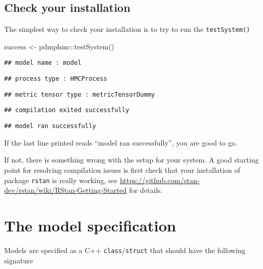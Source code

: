 \documentclass[
]{book}
\newenvironment{Shaded}{\begin{snugshade}}{\end{snugshade}}
\newcommand{\FunctionTok}[1]{\textcolor[rgb]{0.00,0.00,0.00}{#1}}
\newcommand{\NormalTok}[1]{#1}
\newcommand{\OtherTok}[1]{\textcolor[rgb]{0.56,0.35,0.01}{#1}}
\newcommand{\SpecialCharTok}[1]{\textcolor[rgb]{0.00,0.00,0.00}{#1}}
\begin{document}
\hypertarget{check-your-installation}{%
\section{Check your installation}\label{check-your-installation}}

The simplest way to check your installation is to try to run the \texttt{testSystem()}

\begin{Shaded}
\begin{Highlighting}[]
\NormalTok{success }\OtherTok{\textless{}{-}}\NormalTok{ pdmphmc}\SpecialCharTok{::}\FunctionTok{testSystem}\NormalTok{()}
\end{Highlighting}
\end{Shaded}

\begin{verbatim}
## model name : model
\end{verbatim}

\begin{verbatim}
## process type : HMCProcess
\end{verbatim}

\begin{verbatim}
## metric tensor type : metricTensorDummy
\end{verbatim}

\begin{verbatim}
## compilation exited successfully
\end{verbatim}

\begin{verbatim}
## model ran successfully
\end{verbatim}

If the last line printed reads ``model ran successfully'', you are good to go.

If not, there is something wrong with the setup for your system. A good starting point for resolving compilation issues is first check that your installation of package \texttt{rstan} is really working, see \url{https://github.com/stan-dev/rstan/wiki/RStan-Getting-Started} for details.

\hypertarget{the-model-specification}{%
\chapter{The model specification}\label{the-model-specification}}

Models are specified as a C++ \texttt{class}/\texttt{struct} that should have the following
signature
\end{document}
